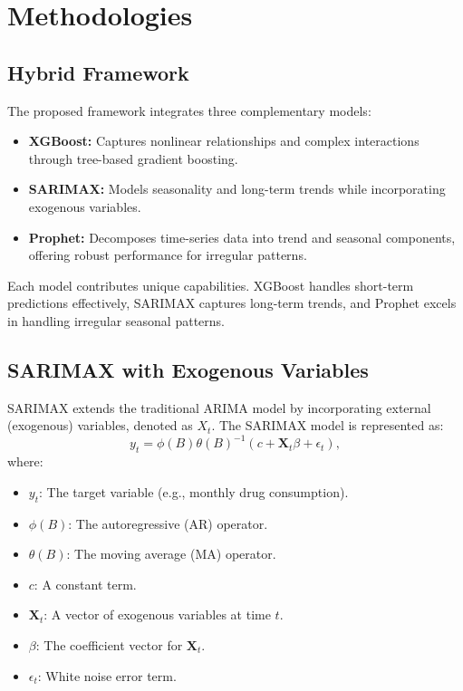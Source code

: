 \documentclass[conference]{IEEEtran}
\begin{document}
\section{Methodologies}

\subsection{Hybrid Framework}
The proposed framework integrates three complementary models:
\begin{itemize}
    \item \textbf{XGBoost:} Captures nonlinear relationships and complex interactions through tree-based gradient boosting.
    \item \textbf{SARIMAX:} Models seasonality and long-term trends while incorporating exogenous variables.
    \item \textbf{Prophet:} Decomposes time-series data into trend and seasonal components, offering robust performance for irregular patterns.
\end{itemize}

Each model contributes unique capabilities. XGBoost handles short-term predictions effectively, SARIMAX captures long-term trends, and Prophet excels in handling irregular seasonal patterns.

\subsection{SARIMAX with Exogenous Variables}
SARIMAX extends the traditional ARIMA model by incorporating external (exogenous) variables, denoted as \( X_t \). The SARIMAX model is represented as:
\begin{equation}
    y_t = \phi(B) \theta(B)^{-1} \left( c + \mathbf{X}_t \beta + \epsilon_t \right),
\end{equation}
where:
\begin{itemize}
    \item \( y_t \): The target variable (e.g., monthly drug consumption).
    \item \( \phi(B) \): The autoregressive (AR) operator.
    \item \( \theta(B) \): The moving average (MA) operator.
    \item \( c \): A constant term.
    \item \( \mathbf{X}_t \): A vector of exogenous variables at time \( t \).
    \item \( \beta \): The coefficient vector for \( \mathbf{X}_t \).
    \item \( \epsilon_t \): White noise error term.
\end{itemize}
\end{document}
